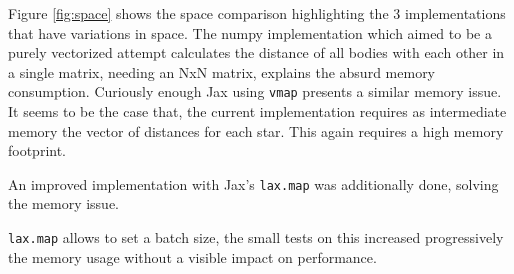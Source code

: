\documentclass[a4paper, 11pt]{article}         %
\begin{document}
Figure \ref{fig:space} shows the space comparison highlighting the 3 implementations that have variations in space. The numpy implementation which aimed to be a purely vectorized attempt
calculates the distance of all bodies with each other in a single matrix, needing an NxN matrix, explains the absurd memory consumption.
Curiously enough Jax using \texttt{vmap} presents a similar memory issue\parencite{TaichiPerformance}.
It seems to be the case that, the current implementation requires as intermediate memory the vector of distances for each star. This again requires a high memory footprint.

An improved implementation with Jax's \texttt{lax.map} was additionally done, solving the memory issue.

\texttt{lax.map} allows to set a batch size, the small tests on this increased progressively the memory usage without a visible impact on performance.
\end{document}
